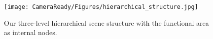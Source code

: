 \begin{figure}
\centering
\texttt{[image: CameraReady/Figures/hierarchical\_structure.jpg]}
\caption{Our three-level hierarchical scene structure with the functional area as internal nodes.}
\label{fig:hierarchy}
\end{figure}